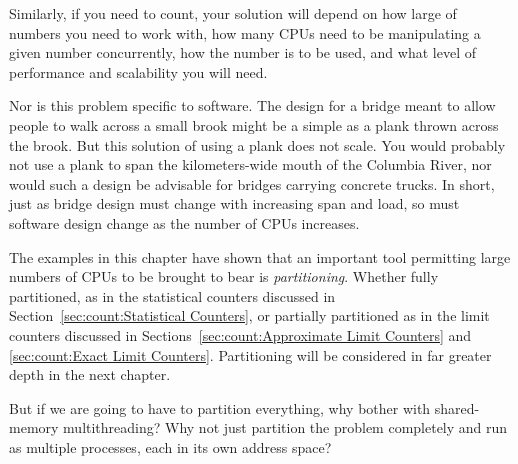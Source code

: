 Similarly, if you need to count, your solution will depend on how large
of numbers you need to work with, how many CPUs need to be manipulating
a given number concurrently, how the number is to be used, and what
level of performance and scalability you will need.

Nor is this problem specific to software.
The design for a bridge meant to allow people to walk across a small brook
might be a simple as a plank thrown across the brook.
But this solution of using a plank does not scale.
You would probably not use a plank to span the kilometers-wide mouth of
the Columbia River, nor would such a design be advisable for bridges
carrying concrete trucks.
In short, just as bridge design must change with increasing span and load,
so must software design change as the number of CPUs increases.

The examples in this chapter have shown that an important tool permitting
large numbers of CPUs to be brought to bear is \emph{partitioning}.
Whether fully partitioned, as in the statistical counters discussed in
Section~\ref{sec:count:Statistical Counters},
or partially partitioned as in the limit counters discussed in
Sections~\ref{sec:count:Approximate Limit Counters} and
\ref{sec:count:Exact Limit Counters}.
Partitioning will be considered in far greater depth in the next chapter.

\QuickQuiz{}
	But if we are going to have to partition everything, why bother
	with shared-memory multithreading?
	Why not just partition the problem completely and run as
	multiple processes, each in its own address space?
 \QuickQuizEnd
